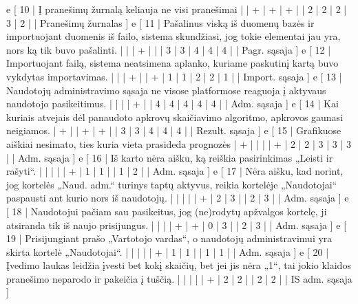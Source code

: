 {  e [ 10  | Į pranešimų žurnalą keliauja ne visi pranešimai
                    |   | + | + | + |   | 2 | 2 | 2 | 3 | 2 |      | Pranešimų žurnalas ]
  e [ 11  | Pašalinus viską iš duomenų bazės ir importuojant duomenis iš failo,
  sistema skundžiasi, jog tokie elementai jau yra, nors ką tik buvo pašalinti.
                    |   |   | + |   |   | 3 | 3 | 4 | 4 | 4 |      | Pagr. sąsaja ]
  e [ 12  | Importuojant failą, sistema neatsimena aplanko, kuriame paskutinį
  kartą buvo vykdytas importavimas.
                    |   |   | + |   | + | 1 | 1 | 2 | 2 | 1 |      | Import. sąsaja ]
  e [ 13  | Naudotojų administravimo sąsaja ne visose platformose reaguoja į
  aktyvaus naudotojo pasikeitimus.
                    |   |   |   | + |   | 4 | 4 | 4 | 4 | 4 |      | Adm. sąsaja ]
  e [ 14  | Kai kuriais atvejais dėl panaudoto apkrovų skaičiavimo algoritmo,
  apkrovos gaunasi neigiamos.
                    | + |   | + | + |   | 3 | 3 | 4 | 4 | 4 |      | Rezult. sąsaja ]
  e [ 15 | Grafikuose aiškiai nesimato, ties kuria vieta prasideda prognozės
                    | + |   |   |   | + | 2 | 2 | 3 | 3 | 3 |      | Adm. sąsaja ]
  e [ 16 | Iš karto nėra aišku, ką reiškia pasirinkimas „Leisti ir rašyti“.
                    |   |   |   |   | + | 1 | 1 |   | 1 | 2 |      | Adm. sąsaja ]
  e [ 17 | Nėra aišku, kad norint, jog kortelės „Naud. adm.“ turinys taptų aktyvus,
  reikia kortelėje „Naudotojai“ paspausti ant kurio nors iš naudotojų.
                    |   |   |   |   | + | 2 | 3 |   | 2 | 3 |      | Adm. sąsaja ]
  e [ 18 | Naudotojui pačiam sau pasikeitus, jog (ne)rodytų apžvalgos kortelę, ji
  atsiranda tik iš naujo prisijungus.
                    |   |   |   | + | + | 0 | 3 |   | 2 | 3 |      | Adm. sąsaja ]
  e [ 19 | Prisijungiant prašo „Vartotojo vardas“, o naudotojų administravimui
  yra skirta kortelė „Naudotojai“.
                    |   |   |   |   | + | 1 | 1 |   | 1 | 1 |      | Adm. sąsaja ]
  e [ 20 | Įvedimo laukas leidžia įvesti bet kokį skaičių, bet jei jis nėra
  „1“, tai jokio klaidos pranešimo neparodo ir pakeičia į tuščią.
                    |   |   |   |   | + | 2 | 2 |   | 2 | 2 |      | IS adm. sąsaja ]
}
